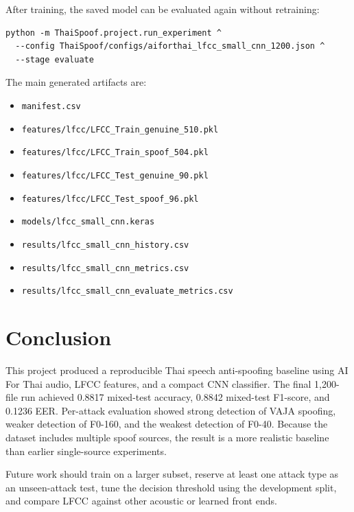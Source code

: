 \documentclass[11pt,a4paper]{article}
\begin{document}
After training, the saved model can be evaluated again without retraining:

\begin{verbatim}
python -m ThaiSpoof.project.run_experiment ^
  --config ThaiSpoof/configs/aiforthai_lfcc_small_cnn_1200.json ^
  --stage evaluate
\end{verbatim}

The main generated artifacts are:

\begin{itemize}
  \item \texttt{manifest.csv}
  \item \texttt{features/lfcc/LFCC\_Train\_genuine\_510.pkl}
  \item \texttt{features/lfcc/LFCC\_Train\_spoof\_504.pkl}
  \item \texttt{features/lfcc/LFCC\_Test\_genuine\_90.pkl}
  \item \texttt{features/lfcc/LFCC\_Test\_spoof\_96.pkl}
  \item \texttt{models/lfcc\_small\_cnn.keras}
  \item \texttt{results/lfcc\_small\_cnn\_history.csv}
  \item \texttt{results/lfcc\_small\_cnn\_metrics.csv}
  \item \texttt{results/lfcc\_small\_cnn\_evaluate\_metrics.csv}
\end{itemize}

\section{Conclusion}

This project produced a reproducible Thai speech anti-spoofing baseline using AI For Thai audio, LFCC features, and a compact CNN classifier. The final 1,200-file run achieved 0.8817 mixed-test accuracy, 0.8842 mixed-test F1-score, and 0.1236 EER. Per-attack evaluation showed strong detection of VAJA spoofing, weaker detection of F0-160, and the weakest detection of F0-40. Because the dataset includes multiple spoof sources, the result is a more realistic baseline than earlier single-source experiments.

Future work should train on a larger subset, reserve at least one attack type as an unseen-attack test, tune the decision threshold using the development split, and compare LFCC against other acoustic or learned front ends.
\end{document}
